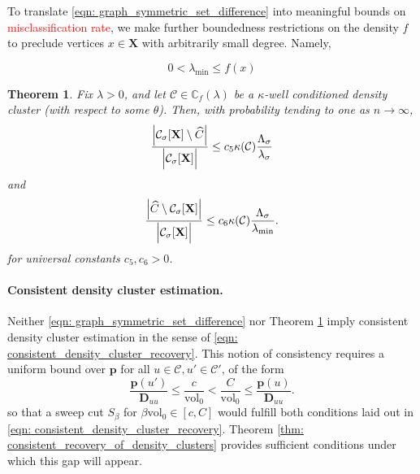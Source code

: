 \documentclass{article}
\newcommand{\vol}{\mathrm{vol}}
\newcommand{\abs}[1]{\left \lvert #1 \right \rvert}
\newcommand{\1}{\mathbf{1}}
\newcommand{\pbf}{\mathbf{p}}
\newcommand{\Xbf}{\mathbf{X}}
\newcommand{\Dbf}{\mathbf{D}}
\newcommand{\Cbb}{\mathbb{C}}
\newcommand{\Cset}{\mathcal{C}}
\newcommand{\Csig}{\Cset_{\sigma}}
\theoremstyle{aldenthm}
\newtheorem{theorem}{Theorem}
\theoremstyle{aldenrmrk}
\begin{document}
To translate \eqref{eqn: graph_symmetric_set_difference} into meaningful bounds on \textcolor{red}{misclassification rate}, we make further boundedness restrictions on the density $f$ to preclude vertices $x \in \Xbf$ with arbitrarily small degree. Namely,

\begin{equation}
\label{eqn: global_bounded_density}
0 < \lambda_{\min} \leq f(x)
\end{equation}

\begin{theorem}
	\label{thm: misclassification_rate}
	Fix $\lambda > 0$, and let $\Cset \in \Cbb_f(\lambda)$ be a $\kappa$-well conditioned density cluster (with respect to some $\theta$). Then, with probability tending to one as $n \to \infty$,
	\begin{equation}
	\label{eqn: misclassification_rate_ub}
	\frac{\abs{\Csig[\Xbf] \setminus \widehat{C}}}{\Bigl|\Csig[\Xbf]\Bigr|} \leq c_5 \kappa(\Cset) \frac{\Lambda_{\sigma}}{\lambda_{\sigma}}
	\end{equation}
	and
	\begin{equation}
	\label{eqn: misclassification_rate__ub_2}
	\frac{\abs{\widehat{C} \setminus \Csig[\Xbf]}}{\Bigl|\Csig[\Xbf]\Bigr|} \leq c_6 \kappa(\Cset) \frac{\Lambda_{\sigma}}{\lambda_{\min}}.
	\end{equation}
	for universal constants $c_5, c_6 > 0$. 
\end{theorem}

\paragraph{Consistent density cluster estimation.}

Neither \eqref{eqn: graph_symmetric_set_difference} nor Theorem \ref{thm: misclassification_rate} imply consistent density cluster estimation in the sense of \eqref{eqn: consistent_density_cluster_recovery}. This notion of consistency requires a uniform bound over $\pbf$ for all $u \in \Cset, u' \in \Cset'$, of the form
\begin{equation}
\label{eqn: ppr_gap}
\frac{\pbf(u')}{\Dbf_{uu}} \leq \frac{c}{\vol_0} < \frac{C}{\vol_0} \leq \frac{\pbf(u)}{\Dbf_{uu}}.
\end{equation}
so that a sweep cut $S_{\beta}$ for $\beta \vol_0 \in [c,C]$ would fulfill both conditions laid out in \eqref{eqn: consistent_density_cluster_recovery}.  Theorem \ref{thm: consistent_recovery_of_density_clusters} provides sufficient conditions under which this gap will appear. 
\end{document}
